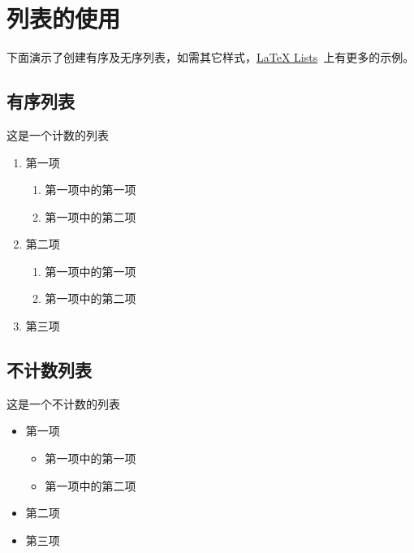 \section{列表的使用}
下面演示了创建有序及无序列表，如需其它样式，\href{https://www.latex-tutorial.com/tutorials/lists/}{LaTeX Lists}~上有更多的示例。

\subsection{有序列表}
这是一个计数的列表
  \begin{enumerate}
      \item 第一项
          \begin{enumerate}
              \item 第一项中的第一项
              \item 第一项中的第二项
          \end{enumerate}
      \item 第二项
    \begin{enumerate}[label=(\roman*)]
      \item 第一项中的第一项
      \item 第一项中的第二项
    \end{enumerate}
      \item 第三项
  \end{enumerate}

\subsection{不计数列表}
  这是一个不计数的列表
  \begin{itemize}
      \item 第一项
      \begin{itemize}
          \item 第一项中的第一项
          \item 第一项中的第二项
      \end{itemize}
      \item 第二项
      \item 第三项
  \end{itemize}

